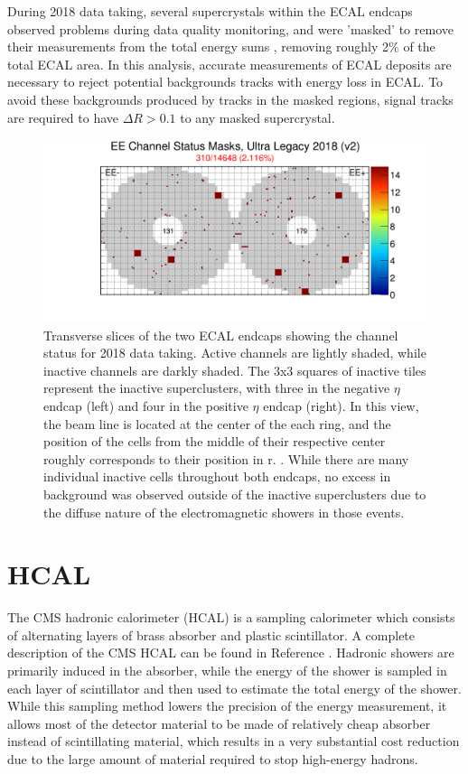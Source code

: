 During 2018 data taking, several supercrystals within the ECAL endcaps observed problems during data quality monitoring, and were 'masked' to remove their measurements from the total energy sums , removing roughly 2$\%$ of the total ECAL area.
In this analysis, accurate measurements of ECAL deposits are necessary to reject potential backgrounds tracks with energy loss in ECAL.
To avoid these backgrounds produced by tracks in the masked regions, signal tracks are required to have $\Delta R>0.1$ to any masked supercrystal.

\begin{figure}[htbp]
    \includegraphics[width=\textwidth]{figures/EEChannelMasks.png}
    \centering
	\caption[Masked ECAL cells]{Transverse slices of the two ECAL endcaps showing the channel status for 2018 data taking. Active channels are lightly shaded, while inactive channels are darkly shaded. The 3x3 squares of inactive tiles represent the inactive superclusters, with three in the negative $\eta$ endcap (left) and four in the positive $\eta$ endcap (right). In this view, the beam line is located at the center of the each ring, and the position of the cells from the middle of their respective center roughly corresponds to their position in r. \cite{EcalDPG}. While there are many individual inactive cells throughout both endcaps, no excess in background was observed outside of the inactive superclusters due to the diffuse nature of the electromagnetic showers in those events.}
    \label{fig:EEmasks}
\end{figure}

\section{HCAL}
The CMS hadronic calorimeter (HCAL) is a sampling calorimeter which consists of alternating layers of brass absorber and plastic scintillator. 
A complete description of the CMS HCAL can be found in Reference \cite{HCALtdr}.
Hadronic showers are primarily induced in the absorber, while the energy of the shower is sampled in each layer of scintillator and then used to estimate the total energy of the shower. 
While this sampling method lowers the precision of the energy measurement, it allows most of the detector material to be made of relatively cheap absorber instead of scintillating material, which results in a very substantial cost reduction due to the large amount of material required to stop high-energy hadrons.

